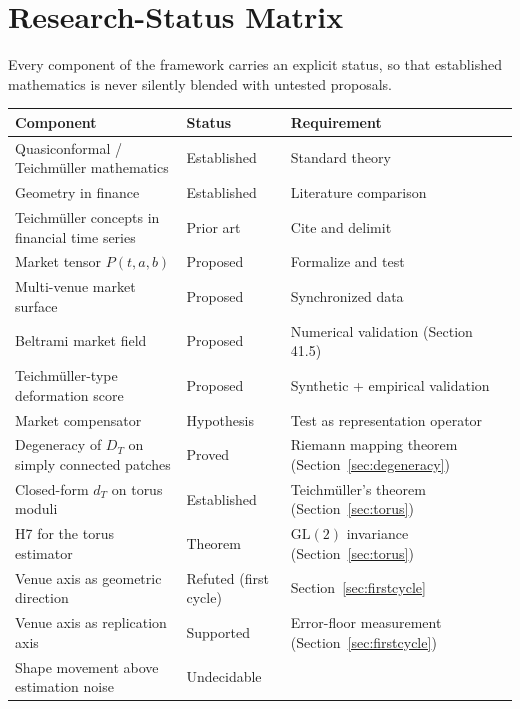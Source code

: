 \documentclass[11pt,a4paper]{article}
\numberwithin{equation}{section}
\begin{document}
\section{Research-Status Matrix}\label{app:status}

Every component of the framework carries an explicit status, so that
established mathematics is never silently blended with untested
proposals.

\begin{center}
\small
\begin{tabular}{p{}p{}p{}}
\toprule
Component & Status & Requirement\\
\midrule
Quasiconformal / Teichmüller mathematics & Established &
  Standard theory \cite{Ahlfors1966,AstalaIwaniecMartin,
  GardinerLakic2000}\\
Geometry in finance & Established &
  Literature comparison \cite{Kanjamapornkul2020,Papaioannou2025,
  PincakKanjamapornkul2018}\\
Teichmüller concepts in financial time series & Prior art &
  Cite and delimit \cite{Kanjamapornkul2017}\\
Market tensor $P(t,a,b)$ & Proposed & Formalize and test\\
Multi-venue market surface & Proposed & Synchronized data\\
Beltrami market field & Proposed &
  Numerical validation (Section 41.5)\\
Teichmüller-type deformation score & Proposed &
  Synthetic + empirical validation\\
Market compensator & Hypothesis &
  Test as representation operator\\
Degeneracy of $D_T$ on simply connected patches & Proved &
  Riemann mapping theorem (Section~\ref{sec:degeneracy})\\
Closed-form $d_T$ on torus moduli & Established &
  Teichmüller's theorem (Section~\ref{sec:torus})\\
H7 for the torus estimator & Theorem &
  $\mathrm{GL}(2)$ invariance (Section~\ref{sec:torus})\\
Venue axis as geometric direction & Refuted (first cycle) &
  Section~\ref{sec:firstcycle}\\
Venue axis as replication axis & Supported &
  Error-floor measurement (Section~\ref{sec:firstcycle})\\
Shape movement above estimation noise & Undecidable &

\end{tabular}
\end{center}
\end{document}
